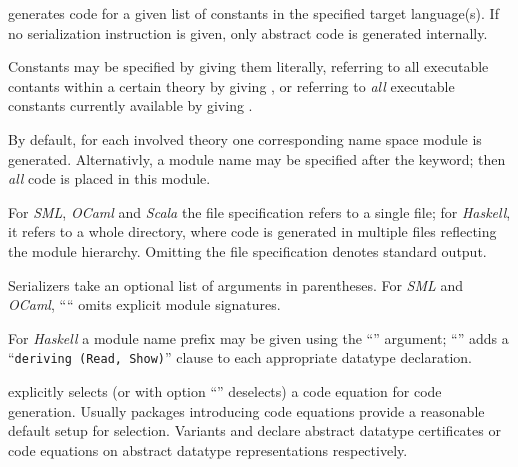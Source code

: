 \begin{isabellebody}
\begin{isamarkuptext}
\begin{description}
  \item \hyperlink{command.HOL.export-code}{\mbox{}} generates code for a given list
  of constants in the specified target language(s).  If no
  serialization instruction is given, only abstract code is generated
  internally.

  Constants may be specified by giving them literally, referring to
  all executable contants within a certain theory by giving , or referring to \emph{all} executable constants currently
  available by giving .

  By default, for each involved theory one corresponding name space
  module is generated.  Alternativly, a module name may be specified
  after the \hyperlink{keyword.module-name}{\mbox{}} keyword; then \emph{all} code is
  placed in this module.

  For \emph{SML}, \emph{OCaml} and \emph{Scala} the file specification
  refers to a single file; for \emph{Haskell}, it refers to a whole
  directory, where code is generated in multiple files reflecting the
  module hierarchy.  Omitting the file specification denotes standard
  output.

  Serializers take an optional list of arguments in parentheses.  For
  \emph{SML} and \emph{OCaml}, ```` omits
  explicit module signatures.

  For \emph{Haskell} a module name prefix may be given using the
  ``'' argument; ``'' adds a
  ``\verb|deriving (Read, Show)|'' clause to each appropriate
  datatype declaration.

  \item \hyperlink{attribute.HOL.code}{\mbox{}} explicitly selects (or with option
  ``'' deselects) a code equation for code generation.
  Usually packages introducing code equations provide a reasonable
  default setup for selection.  Variants  and
   declare abstract datatype certificates or
  code equations on abstract datatype representations respectively.


\end{description}
\end{isamarkuptext}
\end{isabellebody}
